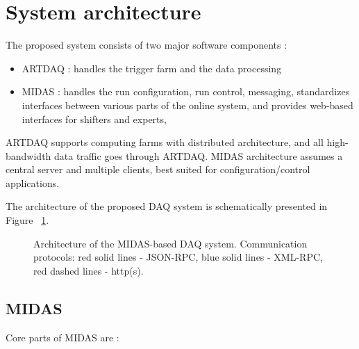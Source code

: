 \section{System architecture}

The proposed system consists of two major software components :
\begin{itemize}
\item
  ARTDAQ : handles the trigger farm and the data processing
\item
  MIDAS : handles the run configuration, run control, messaging,
  standardizes interfaces between various parts of the online system,
  and provides web-based interfaces for shifters and experts,
\end{itemize}

ARTDAQ supports computing farms with distributed architecture, 
and all high-bandwidth data traffic goes through ARTDAQ.
%
MIDAS architecture assumes a central server and multiple clients,
best suited for configuration/control applications.

The architecture of the proposed DAQ system is schematically presented
in Figure ~\ref{figure:system_architecture}.

\begin{figure}[H]
  \caption{
    \label{figure:system_architecture}
    Architecture of the MIDAS-based DAQ system. Communication protocols:
    red solid lines - JSON-RPC, blue solid lines - XML-RPC,
    red dashed lines - http(s).
  }
\end{figure}

\subsection{MIDAS}

Core parts of MIDAS are :

